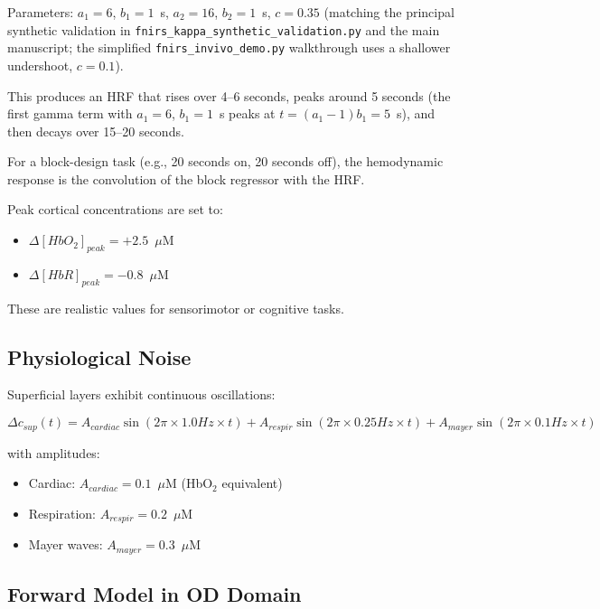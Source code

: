 \documentclass[12pt]{article}
\def\text#1{#1}%
\def\,{ }%
\begin{document}
Parameters: $a_1 = 6$, $b_1 = 1$~s, $a_2 = 16$, $b_2 = 1$~s, $c = 0.35$ (matching the principal synthetic validation in \texttt{fnirs\_kappa\_synthetic\_validation.py} and the main manuscript; the simplified \texttt{fnirs\_invivo\_demo.py} walkthrough uses a shallower undershoot, $c = 0.1$).

This produces an HRF that rises over 4--6 seconds, peaks around 5 seconds (the first gamma term with $a_1=6$, $b_1=1$~s peaks at $t=(a_1-1)b_1=5$~s), and then decays over 15--20 seconds.

For a block-design task (e.g., 20 seconds on, 20 seconds off), the hemodynamic response is the convolution of the block regressor with the HRF.

Peak cortical concentrations are set to:
\begin{itemize}
\item $\Delta[\text{HbO}_2]_{\text{peak}} = +2.5$~$\mu$M
\item $\Delta[\text{HbR}]_{\text{peak}} = -0.8$~$\mu$M
\end{itemize}

These are realistic values for sensorimotor or cognitive tasks.

\subsection{Physiological Noise}

Superficial layers exhibit continuous oscillations:

\begin{equation}
\Delta c_{\text{sup}}(t) = A_{\text{cardiac}} \sin(2\pi \times 1.0 \, \text{Hz} \times t) + A_{\text{respir}} \sin(2\pi \times 0.25 \, \text{Hz} \times t) + A_{\text{mayer}} \sin(2\pi \times 0.1 \, \text{Hz} \times t)
\end{equation}

with amplitudes:
\begin{itemize}
\item Cardiac: $A_{\text{cardiac}} = 0.1$~$\mu$M (HbO$_2$ equivalent)
\item Respiration: $A_{\text{respir}} = 0.2$~$\mu$M
\item Mayer waves: $A_{\text{mayer}} = 0.3$~$\mu$M
\end{itemize}

\subsection{Forward Model in OD Domain}
\end{document}
